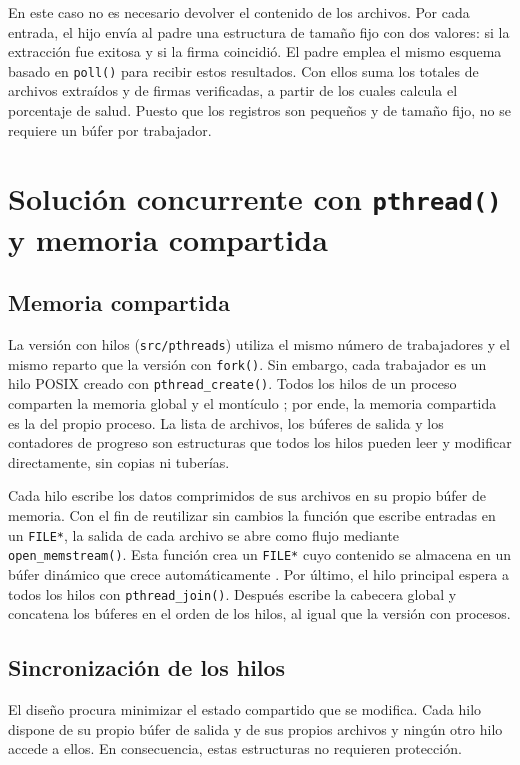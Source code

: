 \documentclass{report}
\begin{document}
En este caso no es necesario devolver el contenido de los archivos. Por cada entrada, el hijo envía al padre una estructura de tamaño fijo con dos valores: si la extracción fue exitosa y si la firma coincidió. El padre emplea el mismo esquema basado en \texttt{poll()} para recibir estos resultados. Con ellos suma los totales de archivos extraídos y de firmas verificadas, a partir de los cuales calcula el porcentaje de salud. Puesto que los registros son pequeños y de tamaño fijo, no se requiere un búfer por trabajador.

\section{Solución concurrente con \texttt{pthread()} y memoria compartida}\label{impl-pthreads}

\subsection{Memoria compartida}

La versión con hilos (\texttt{src/pthreads}) utiliza el mismo número de trabajadores y el mismo reparto que la versión con \texttt{fork()}. Sin embargo, cada trabajador es un hilo POSIX creado con \texttt{pthread\_create()}. Todos los hilos de un proceso comparten la memoria global y el montículo \cite{manpthreads}; por ende, la memoria compartida es la del propio proceso. La lista de archivos, los búferes de salida y los contadores de progreso son estructuras que todos los hilos pueden leer y modificar directamente, sin copias ni tuberías.

Cada hilo escribe los datos comprimidos de sus archivos en su propio búfer de memoria. Con el fin de reutilizar sin cambios la función que escribe entradas en un \texttt{FILE*}, la salida de cada archivo se abre como flujo mediante \texttt{open\_memstream()}. Esta función crea un \texttt{FILE*} cuyo contenido se almacena en un búfer dinámico que crece automáticamente \cite{manmemstream}. Por último, el hilo principal espera a todos los hilos con \texttt{pthread\_join()}. Después escribe la cabecera global y concatena los búferes en el orden de los hilos, al igual que la versión con procesos.

\subsection{Sincronización de los hilos}

El diseño procura minimizar el estado compartido que se modifica. Cada hilo dispone de su propio búfer de salida y de sus propios archivos y ningún otro hilo accede a ellos. En consecuencia, estas estructuras no requieren protección.
\end{document}
